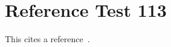 \documentclass{article}
\begin{document}
\section{Reference Test 113}
This cites a reference~\cite{test113}.

\end{document}

